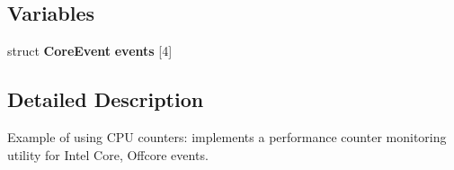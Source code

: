 \subsection*{Variables}
\begin{DoxyCompactItemize}
\item 
struct {\bf Core\+Event} {\bfseries events} [4]\label{pcm-core_8cpp_a0ae00fbd22b434b051a6b708d5d4ecd2}

\end{DoxyCompactItemize}


\subsection{Detailed Description}
Example of using C\+PU counters\+: implements a performance counter monitoring utility for Intel Core, Offcore events. 

